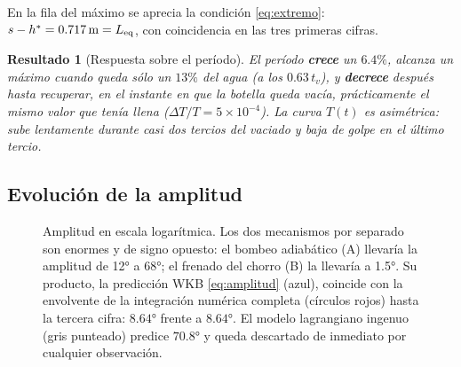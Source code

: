 \documentclass[11pt,a4paper]{article}
\newtheorem{resultado}{Resultado}
\begin{document}
\noindent
En la fila del máximo se aprecia la condición \eqref{eq:extremo}: $s-h^\ast = \SI{0.717}{\meter} =
L_{\rm eq}$, con coincidencia en las tres primeras cifras.

\begin{resultado}[Respuesta sobre el período]
El período \textbf{crece} un $6.4\%$, alcanza un máximo cuando queda sólo un $13\%$ del agua
(a los $0.63\,t_v$), y \textbf{decrece} después hasta recuperar, en el instante en que la botella
queda vacía, prácticamente el mismo valor que tenía llena ($\Delta T/T = 5\times10^{-4}$).
La curva $T(t)$ es asimétrica: sube lentamente durante casi dos tercios del vaciado y baja de
golpe en el último tercio.
\end{resultado}

\subsection{Evolución de la amplitud}

\begin{figure}[H]
\centering
{}
\caption{Amplitud en escala logarítmica. Los dos mecanismos por separado son enormes y de signo
opuesto: el bombeo adiabático (A) llevaría la amplitud de \ang{12} a \ang{68}; el frenado del
chorro (B) la llevaría a \ang{1.5}. Su producto, la predicción WKB \eqref{eq:amplitud}
(azul), coincide con la envolvente de la integración numérica completa (círculos rojos) hasta la
tercera cifra: $\ang{8.64}$ frente a $\ang{8.64}$. El modelo lagrangiano ingenuo (gris punteado)
predice $\ang{70.8}$ y queda descartado de inmediato por cualquier observación.}
\label{fig:amplitud}
\end{figure}
\end{document}
